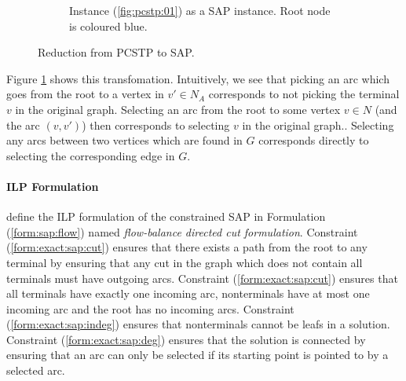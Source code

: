 \begin{figure}[h]
\begin{subfigure}[t]{0.47\linewidth}
    \caption{Instance (\ref{fig:pcstp:01}) as a SAP instance. Root node is coloured blue.}
  \end{subfigure}
  \caption{Reduction from PCSTP to SAP.}
  \label{fig:scip:pcstptosap}
\end{figure}

Figure \ref{fig:scip:pcstptosap} shows this transfomation. Intuitively, we see that
picking an arc which goes from the root to a vertex in $v' \in N_A$
corresponds to not picking the terminal $v$ in the original graph. Selecting an arc from the root
to some vertex $v \in N$ (and the arc $(v, v')$) then corresponds to selecting $v$
in the original graph.. Selecting any arcs between two vertices which are found in $G$ corresponds
directly to selecting the corresponding edge in $G$.

 \paragraph{ILP Formulation}
 \cite{gamrath2017scip} define the ILP formulation of the constrained SAP in Formulation (\ref{form:sap:flow})
 named \textit{flow-balance directed cut formulation}. Constraint (\ref{form:exact:sap:cut}) ensures that there exists a
  path from the root to any terminal by ensuring that any
 cut in the graph which does not contain all terminals must have outgoing arcs. Constraint (\ref{form:exact:sap:cut})
 ensures that all terminals have exactly one incoming arc, nonterminals have at most one incoming arc and the root has
 no incoming arcs. Constraint (\ref{form:exact:sap:indeg}) ensures that nonterminals cannot be leafs in a solution.
 Constraint (\ref{form:exact:sap:deg}) ensures that the solution is connected by ensuring that an arc can only be selected
 if its starting point is pointed to by a selected arc.

